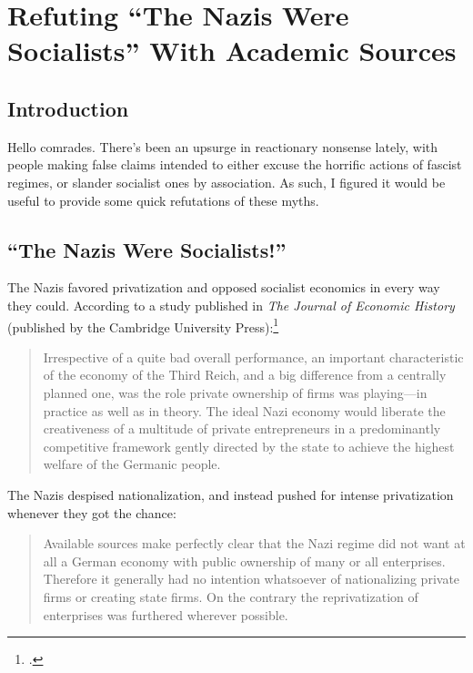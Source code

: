 \section[Refuting ``The Nazis Were Socialists'']{Refuting ``The Nazis Were Socialists'' With Academic Sources\\}
\subsection*{Introduction}

Hello comrades.
There's been an upsurge in reactionary nonsense lately, with people making false claims intended to either excuse the horrific actions of fascist regimes, or slander socialist ones by association.
As such, I figured it would be useful to provide some quick refutations of these myths.

\subsection*{``The Nazis Were Socialists!''}

The Nazis favored privatization and opposed socialist economics in every way they could.
According to a study published in \textit{The Journal of Economic History} (published by the Cambridge University Press):\footcite{private-property}

\begin{quote}
    Irrespective of a quite bad overall performance, an important characteristic of the economy of the Third Reich, and a big difference from a centrally planned one, was the role private ownership of firms was playing---in practice as well as in theory.
    The ideal Nazi economy would liberate the creativeness of a multitude of private entrepreneurs in a predominantly competitive framework gently directed by the state to achieve the highest welfare of the Germanic people.
\end{quote}

The Nazis despised nationalization, and instead pushed for intense privatization whenever they got the chance:

\begin{quote}
    Available sources make perfectly clear that the Nazi regime did not want at all a German economy with public ownership of many or all enterprises.
    Therefore it generally had no intention whatsoever of nationalizing private firms or creating state firms.
    On the contrary the reprivatization of enterprises was furthered wherever possible.
\end{quote}

